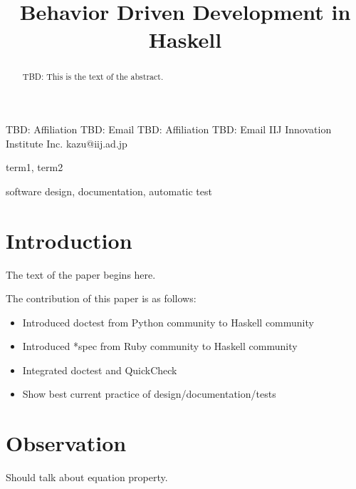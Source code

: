 \documentclass[preprint]{sigplanconf}
\begin{document}
\copyrightdata{[to be supplied]} 


\title{Behavior Driven Development in Haskell}

           {TBD: Affiliation}
           {TBD: Email}
           {TBD: Affiliation}
           {TBD: Email}
           {IIJ Innovation Institute Inc.}
           {kazu@iij.ad.jp}

\maketitle

\begin{abstract}
TBD: This is the text of the abstract.
\end{abstract}


\terms
term1, term2

\keywords
software design, documentation, automatic test

\section{Introduction}

The text of the paper begins here.

The contribution of this paper is as follows:

\begin{itemize}
\item Introduced doctest from Python community to Haskell community
\item Introduced *spec from Ruby community to Haskell community
\item Integrated doctest and QuickCheck
\item Show best current practice of design/documentation/tests
\end{itemize}

\section{Observation}

Should talk about equation property.
\end{document}
